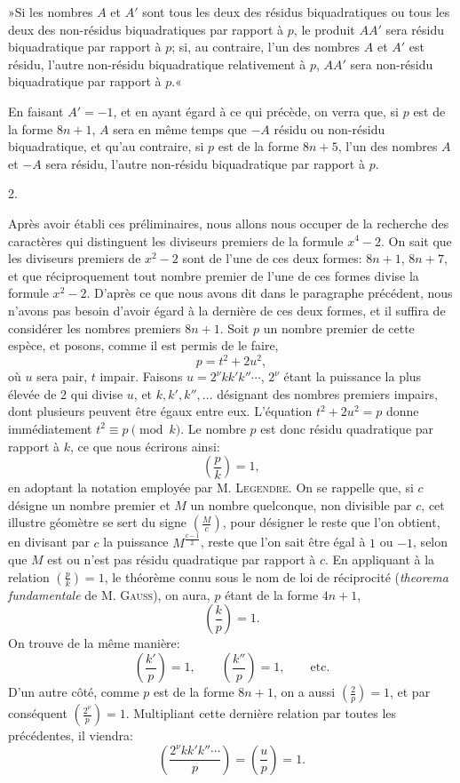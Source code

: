 \documentclass[11pt]{article}
\newcommand{\leg}[2]{\left(\frac{#1}{#2}\right)}
\newcommand{\unitid}[1]{\hypertarget{#1}{}}
\begin{document}
\unitid{dirichlet.v1.p04a.thm.002}»Si les nombres $A$ et $A'$ sont tous les deux des résidus biquadratiques ou tous les deux des non-résidus biquadratiques par rapport à $p$, le produit $AA'$ sera résidu biquadratique par rapport à $p$; si, au contraire, l'un des nombres $A$ et $A'$ est résidu, l'autre non-résidu biquadratique relativement à $p$, $AA'$ sera non-résidu biquadratique par rapport à $p$.«

\unitid{dirichlet.v1.p04a.par.007}En faisant $A'=-1$, et en ayant égard à ce qui précède, on verra que, si $p$ est de la forme $8n+1$, $A$ sera en même temps que $-A$ résidu ou non-résidu biquadratique, et qu'au contraire, si $p$ est de la forme $8n+5$, l'un des nombres $A$ et $-A$ sera résidu, l'autre non-résidu biquadratique par rapport à $p$.

\begin{center}2.\end{center}

\unitid{dirichlet.v1.p04a.par.008}Après avoir établi ces préliminaires, nous allons nous occuper de la recherche des caractères qui distinguent les diviseurs premiers de la formule $x^4-2$. On sait que les diviseurs premiers de $x^2-2$ sont de l'une de ces deux formes: $8n+1$, $8n+7$, et que réciproquement tout nombre premier de l'une de ces formes divise la formule $x^2-2$. D'après ce que nous avons dit dans le paragraphe précédent, nous n'avons pas besoin d'avoir égard à la dernière de ces deux formes, et il suffira de considérer les nombres premiers $8n+1$. Soit $p$ un nombre premier de cette espèce, et posons, comme il est permis de le faire,
\[
 p=t^2+2u^2,
\]
où $u$ sera pair, $t$ impair. Faisons $u=2^\nu kk'k''\cdots$, $2^\nu$ étant la puissance la plus élevée de 2 qui divise $u$, et $k,k',k'',\ldots$ désignant des nombres premiers impairs, dont plusieurs peuvent être égaux entre eux. L'équation $t^2+2u^2=p$ donne immédiatement $t^2\equiv p\pmod k$. Le nombre $p$ est donc résidu quadratique par rapport à $k$, ce que nous écrirons ainsi:
\[
 \leg{p}{k}=1,
\]
en adoptant la notation employée par M. \textsc{Legendre}. On se rappelle que, si $c$ désigne un nombre premier et $M$ un nombre quelconque, non divisible par $c$, cet illustre géomètre se sert du signe $\leg{M}{c}$, pour désigner le reste que l'on obtient, en divisant par $c$ la puissance $M^{\frac{c-1}{2}}$, reste que l'on sait être égal à $1$ ou $-1$, selon que $M$ est ou n'est pas résidu quadratique par rapport à $c$. En appliquant à la relation $\leg{p}{k}=1$, le théorème connu sous le nom de loi de réciprocité (\emph{theorema fundamentale} de M. \textsc{Gauss}), on aura, $p$ étant de la forme $4n+1$,
\[
 \leg{k}{p}=1.
\]
On trouve de la même manière:
\[
 \leg{k'}{p}=1,\qquad \leg{k''}{p}=1,\qquad \text{etc.}
\]
D'un autre côté, comme $p$ est de la forme $8n+1$, on a aussi $\leg{2}{p}=1$, et par conséquent $\leg{2^\nu}{p}=1$. Multipliant cette dernière relation par toutes les précédentes, il viendra:
\[
 \leg{2^\nu kk'k''\cdots}{p}=\leg{u}{p}=1.
\]
\end{document}
